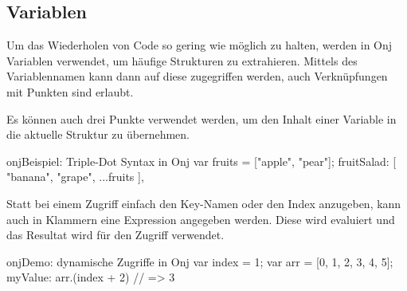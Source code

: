 
\subsection{Variablen}\label{subsec:variablen}

\renewcommand{\kapitelautor}{Autor: Marvin Kurka}

Um das Wiederholen von Code so gering wie möglich zu halten, werden in Onj Variablen verwendet, um häufige Strukturen
zu extrahieren.
Mittels des Variablennamen kann dann auf diese zugegriffen werden, auch Verknüpfungen mit Punkten sind erlaubt.


Es können auch drei Punkte verwendet werden, um den Inhalt einer Variable in die aktuelle Struktur zu übernehmen.

\begin{codeBlock}{onj}{Beispiel: Triple-Dot Syntax in Onj}
var fruits = ["apple", "pear"];
fruitSalad: [
    "banana",
    "grape",
    ...fruits
],
\end{codeBlock}

Statt bei einem Zugriff einfach den Key-Namen oder den Index anzugeben, kann auch in Klammern eine Expression angegeben
werden.
Diese wird evaluiert und das Resultat wird für den Zugriff verwendet.

\begin{codeBlock}{onj}{Demo: dynamische Zugriffe in Onj}
var index = 1;
var arr = [0, 1, 2, 3, 4, 5];
myValue: arr.(index + 2) // => 3
\end{codeBlock}

\renewcommand{\kapitelautor}{}
